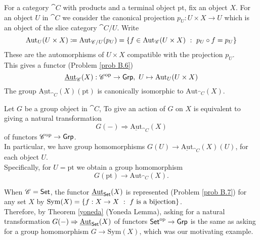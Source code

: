 \vspace*{0.1in}

\begin{discussion}\label{autgrp}
For a category $\cat{C}$ with products and a terminal object $\mathrm{pt}$, fix an object $X$. For an object $U$ in $\cat{C}$ we consider the canonical projection $p_U:U \times X \to U$ which is an object of the slice category $\cat{C}/U$. Write
\[\mathrm{Aut}_U(U \times X) \coloneqq \mathrm{Aut}_{\mathscr{C}/U}(p_U) = \left\{f \in \mathrm{Aut}_{\mathscr{C}}(U \times X)\ :\ p_U\circ f = p_U\right\}\]
These are the automorphisms of $U \times X$ compatible with the projection $p_U$.\\[1em]
This gives a functor (Problem \ref{prob B.6})
\[\underline{\mathrm{Aut}}_{\mathscr{C}}(X):\mathscr{C}^{\text{op}} \to \mathsf{Grp},\ U \mapsto \mathrm{Aut}_U(U \times X)\]
The group $\underline{\mathrm{Aut}}_{\cat{C}}(X)(\mathrm{pt})$ is canonically isomorphic to $\mathrm{Aut}_{\cat{C}}(X)$.
\end{discussion}

\vspace*{0.1in}

\begin{proposition}
Let $G$ be a group object in $\cat{C}$, To give an action of $G$ on $X$ is equivalent to giving a natural transformation \[G(-) \Rightarrow \underline{\mathrm{Aut}}_{\cat{C}}(X)\] of functors $\mathscr{C}^{\text{op}} \to \mathsf{Grp}$.\\[0.5em]
In particular, we have group homomorphisms $G(U) \to \underline{\mathrm{Aut}}_{\cat{C}}(X)(U)$, for each object $U$.\\[0.5em] Specifically, for $U = \mathrm{pt}$ we obtain a group homomorphism \[G(\mathrm{pt}) \to \mathrm{Aut}_{\cat{C}}(X).\]
\end{proposition}


\begin{remark}
When $\mathscr{C} = \mathsf{Set}$, the functor $\underline{\mathrm{Aut}}_{\mathsf{Set}}(X)$ is represented (Problem \ref{prob B.7}) for any set $X$ by $\mathrm{Sym}(X) = \left\{f:X \to X\ :\ f \text{ is a bijection}\right\}$.\\[0.5em]
Therefore, by Theorem \ref{yoneda} (Yoneda Lemma), asking for a natural transformation $G(-) \Rightarrow \underline{\mathrm{Aut}}_{\mathsf{Set}}(X)$ of functors $\mathsf{Set}^{\text{op}} \to \mathsf{Grp}$ is the same as asking for a group homomorphism $G \to \mathrm{Sym}(X)$, which was our motivating example.
\end{remark}


